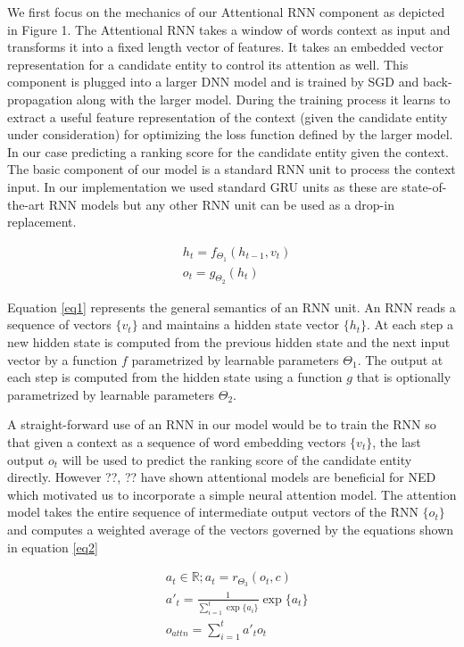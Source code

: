 \documentclass[11pt]{article}
\begin{document}
We first focus on the mechanics of our Attentional RNN component as depicted in Figure 1. The Attentional RNN takes a window of words context as input and transforms it into a fixed length vector of features. It takes an embedded vector representation for a candidate entity to control its attention as well. This component is plugged into a larger DNN model and is trained by SGD and back-propagation along with the larger model. During the training process it learns to extract a useful feature representation of the context (given the candidate entity under consideration) for optimizing the loss function defined by the larger model. In our case predicting a ranking score for the candidate entity given the context.
The basic component of our model is a standard RNN unit to process the context input. In our implementation we used standard GRU units \cite{cho2014learning} as these are state-of-the-art RNN models but any other RNN unit can be used as a drop-in replacement. 

\begin{equation}
	\label{eq1}
	\begin{aligned}
		& h_t=f_{\Theta_1}(h_{t-1}, v_t) \\
		& o_t=g_{\Theta_2}(h_t)
	\end{aligned}
\end{equation}

Equation \ref{eq1} represents the general semantics of an RNN unit. An RNN reads a sequence of vectors $\{v_t\}$ and maintains a hidden state vector $\{h_t\}$. At each step a new hidden state is computed from the previous hidden state and the next input vector by a function $f$ parametrized by learnable parameters $\Theta_1$. The output at each step is computed from the hidden state using a function $g$ that is optionally parametrized by learnable parameters $\Theta_2$. 

A straight-forward use of an RNN in our model would be to train the RNN so that given a context as a sequence of word embedding vectors $\{v_t\}$, the last output $o_t$ will be used to predict the ranking score of the candidate entity directly. However ??, ?? have shown attentional models are beneficial for NED which motivated us to incorporate a simple neural attention model. The attention model takes the entire sequence of intermediate output vectors of the RNN $\{o_t\}$ and computes a weighted average of the vectors governed by the equations shown in equation \ref{eq2}

\begin{equation}
	\label{eq2}
	\begin{aligned}
	& a_t \in \mathbb{R}; a_t=r_{\Theta_3}(o_t, c) \\
	& a'_t  = \frac{1}{\sum_{i=1}^{t} \exp\{a_i\}} \exp \{a_t\} \\
	& o_{attn}=\sum_{i=1}^{t} a'_t o_t
	\end{aligned}
\end{equation}
\end{document}
